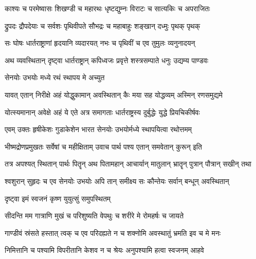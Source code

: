 \twolineshloka
{काश्यः च परमेष्वासः शिखण्डी च महारथः}
{धृष्टद्युम्नः विराटः च सात्यकिः च अपराजितः}%

\twolineshloka
{द्रुपदः द्रौपदेयाः च सर्वशः पृथिवीपते}
{सौभद्रः च महाबाहुः शङ्खान् दध्मुः पृथक् पृथक्}%

\twolineshloka
{सः घोषः धार्तराष्ट्राणां हृदयानि व्यदारयत्}
{नभः च पृथिवीं च एव तुमुलः व्यनुनादयन्}%

\twolineshloka
{अथ व्यवस्थितान् दृष्ट्वा धार्तराष्ट्रान् कपिध्वजः}
{प्रवृत्ते शस्त्रसम्पाते धनुः उद्यम्य पाण्डवः}%



\onelineshloka
{सेनयोः उभयोः मध्ये रथं स्थापय मे अच्युत}%

\twolineshloka
{यावत् एतान् निरीक्षे अहं योद्धुकामान् अवस्थितान्}
{कैः मया सह योद्धव्यम् अस्मिन् रणसमुद्यमे}%

\twolineshloka
{योत्स्यमानान् अवेक्षे अहं ये एते अत्र समागताः}
{धार्तराष्ट्रस्य दुर्बुद्धेः युद्धे प्रियचिकीर्षवः}%


\twolineshloka
{एवम् उक्तः हृषीकेशः गुडाकेशेन भारत}
{सेनयोः उभयोर्मध्ये स्थापयित्वा रथोत्तमम्}%

\twolineshloka
{भीष्मद्रोणप्रमुखतः सर्वेषां च महीक्षिताम्}
{उवाच पार्थ पश्य एतान् समवेतान् कुरून् इति}%

\twolineshloka
{तत्र अपश्यत् स्थितान् पार्थः पितॄन् अथ पितामहान्}
{आचार्यान् मातुलान् भ्रातॄन् पुत्रान् पौत्रान् सखीन् तथा}%

\twolineshloka
{श्वशुरान् सुहृदः च एव सेनयोः उभयोः अपि}
{तान् समीक्ष्य सः कौन्तेयः सर्वान् बन्धून् अवस्थितान्}%



\onelineshloka
{दृष्ट्वा इमं स्वजनं कृष्ण युयुत्सुं समुपस्थितम्}%

\twolineshloka
{सीदन्ति मम गात्राणि मुखं च परिशुष्यति}
{वेपथुः च शरीरे मे रोमहर्षः च जायते}%

\twolineshloka
{गाण्डीवं स्रंसते हस्तात् त्वक् च एव परिदह्यते}
{न च शक्नोमि अवस्थातुं भ्रमति इव च मे मनः}%

\twolineshloka
{निमित्तानि च पश्यामि विपरीतानि केशव}
{न च श्रेयः अनुपश्यामि हत्वा स्वजनम् आहवे}%

